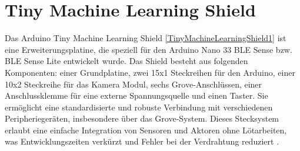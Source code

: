 \section{Tiny Machine Learning Shield}

Das Arduino Tiny Machine Learning Shield \ref{TinyMachineLearningShield1} ist eine Erweiterungsplatine, die speziell für den Arduino Nano 33 BLE Sense bzw. BLE Sense Lite entwickelt wurde. Das Shield besteht aus folgenden Komponenten: einer Grundplatine, zwei 15x1 Steckreihen für den Arduino, einer 10x2 Steckreihe für das Kamera Modul, sechs Grove-Anschlüssen, einer Anschlussklemme für eine externe Spannungsquelle und einen Taster. Sie ermöglicht eine standardisierte und robuste Verbindung mit verschiedenen Peripheriegeräten, insbesondere über das Grove-System. Dieses Stecksystem erlaubt eine einfache Integration von Sensoren und Aktoren ohne Lötarbeiten, was Entwicklungszeiten verkürzt und Fehler bei der Verdrahtung reduziert \cite{ArduinoKit:2022}.

